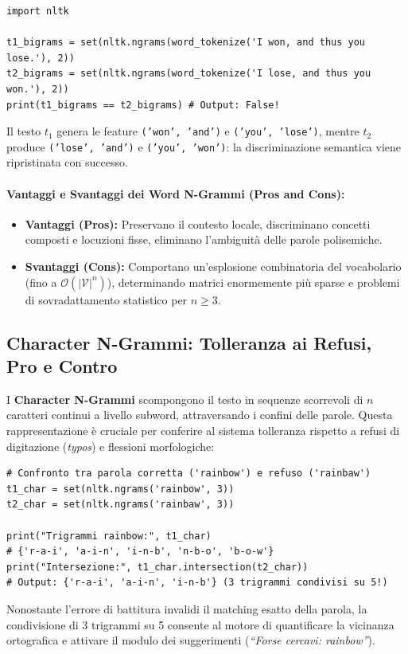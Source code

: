 \begin{lstlisting}[style=pythoncode,caption={Preservazione dell'ordine locale tramite bigrammi di parole in Python.}]
import nltk

t1_bigrams = set(nltk.ngrams(word_tokenize('I won, and thus you lose.'), 2))
t2_bigrams = set(nltk.ngrams(word_tokenize('I lose, and thus you won.'), 2))
print(t1_bigrams == t2_bigrams) # Output: False!
\end{lstlisting}
Il testo $t_1$ genera le feature \texttt{('won', 'and')} e \texttt{('you', 'lose')}, mentre $t_2$ produce \texttt{('lose', 'and')} e \texttt{('you', 'won')}: la discriminazione semantica viene ripristinata con successo.

\paragraph{Vantaggi e Svantaggi dei Word N-Grammi (Pros and Cons):}
\begin{itemize}
    \item \textbf{Vantaggi (Pros):} Preservano il contesto locale, discriminano concetti composti e locuzioni fisse, eliminano l'ambiguit\`a delle parole polisemiche.
    \item \textbf{Svantaggi (Cons):} Comportano un'esplosione combinatoria del vocabolario (fino a $\mathcal{O}(|\mathcal{V}|^n)$), determinando matrici enormemente pi\`u sparse e problemi di sovradattamento statistico per $n \ge 3$.
\end{itemize}

\FloatBarrier
\subsection{Character N-Grammi: Tolleranza ai Refusi, Pro e Contro}
\label{subsec:character-ngrams}

I \textbf{Character N-Grammi} scompongono il testo in sequenze scorrevoli di $n$ caratteri continui a livello subword, attraversando i confini delle parole. Questa rappresentazione \`e cruciale per conferire al sistema tolleranza rispetto a refusi di digitazione (\textit{typos}) e flessioni morfologiche:

\begin{lstlisting}[style=pythoncode,caption={Tolleranza agli errori di digitazione con trigrammi di caratteri in Python.}]
# Confronto tra parola corretta ('rainbow') e refuso ('rainbaw')
t1_char = set(nltk.ngrams('rainbow', 3))
t2_char = set(nltk.ngrams('rainbaw', 3))

print("Trigrammi rainbow:", t1_char)
# {'r-a-i', 'a-i-n', 'i-n-b', 'n-b-o', 'b-o-w'}
print("Intersezione:", t1_char.intersection(t2_char))
# Output: {'r-a-i', 'a-i-n', 'i-n-b'} (3 trigrammi condivisi su 5!)
\end{lstlisting}
Nonostante l'errore di battitura invalidi il matching esatto della parola, la condivisione di 3 trigrammi su 5 consente al motore di quantificare la vicinanza ortografica e attivare il modulo dei suggerimenti (\textit{``Forse cercavi: rainbow''}).

